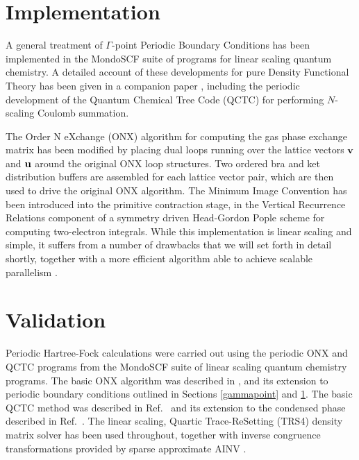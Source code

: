 \documentclass[prb,aps,nobibnotes,twocolumn,doublespace,twocolumngrid,superbib]{revtex4}
\begin{document}

\section{Implementation}\label{implementation}

A general treatment of $\Gamma$-point Periodic Boundary Conditions has been implemented in the MondoSCF
suite of programs for linear scaling quantum chemistry.  A detailed account of these developments for 
pure Density Functional Theory has been given in a companion paper \cite{}, including the periodic 
development of the Quantum Chemical Tree Code ({\sc QCTC}) for performing $N$-scaling Coulomb summation.  

The Order N eXchange ({\sc ONX}) algorithm \cite{} for computing the gas phase exchange matrix 
has been modified by placing dual loops running over the lattice vectors 
$\bf v$ and $\bf u$ around the original ONX loop structures.  Two ordered bra and ket distribution 
buffers are assembled for each lattice vector pair, which are then used to drive the original {\sc ONX} algorithm.
The Minimum Image Convention has been introduced into the primitive contraction stage, in the 
Vertical Recurrence Relations component of a symmetry driven Head-Gordon Pople \cite{} scheme for 
computing two-electron integrals.  While this implementation is linear scaling and simple, it suffers 
from a number of drawbacks that we will set forth in detail shortly, together with a more efficient 
algorithm able to achieve scalable parallelism \cite{}.


\section{Validation}

Periodic Hartree-Fock calculations were carried out using the periodic {\sc ONX} and {\sc QCTC}
programs from the {\sc MondoSCF} suite of linear scaling quantum chemistry programs.  The basic 
{\sc ONX} algorithm was described in \onlinecite{}, and its extension to periodic boundary conditions
outlined in Sections \ref{gammapoint} and \ref{implementation}.  The basic {\sc QCTC} method
was described in Ref.~\onlinecite{} and its extension to the condensed phase described in 
Ref.~.   The linear scaling, Quartic Trace-ReSetting ({\sc TRS4}) density 
matrix solver has been used throughout, together with inverse congruence transformations provided
by sparse approximate {\sc AINV} \cite{}.  
\end{document}
